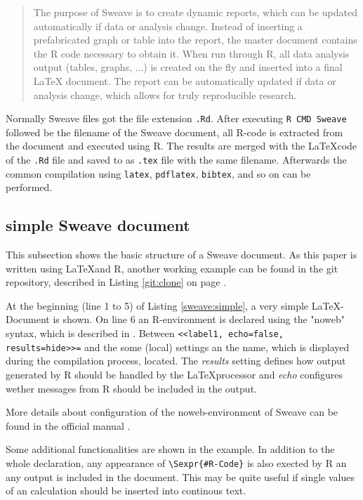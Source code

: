 \documentclass{ifacconf}
\begin{document}
\begin{quotation}
The purpose of Sweave is to create dynamic reports, 
which can be updated automatically if data or
analysis change. Instead of inserting a prefabricated
graph or table into the report, the master document
contains the R code necessary to obtain it. When run
through R, all data analysis output (tables, graphs, ...) 
is created on the fly and inserted into a final \LaTeX
document. The report can be automatically updated
if data or analysis change, which allows for truly reproducible research.
\end{quotation}

Normally Sweave files got the file extension \texttt{.Rd}. 
After executing \texttt{R CMD Sweave} followed be the filename
of the Sweave document, all R-code is extracted from the document and executed using R.
The results are merged with the \LaTeX code of the \texttt{.Rd} file and saved
to as \texttt{.tex} file with the same filename. Afterwards the common 
compilation using \texttt{latex}, \texttt{pdflatex}, \texttt{bibtex}, and so on
can be performed.

\subsection{simple Sweave document}

This subsection shows the basic structure of a Sweave document. As this
paper is written using \LaTeX and R, another working example can be found
in the git repository, described in Listing \ref{git:clone} on page
\pageref{git:clone}.

At the beginning (line 1 to 5) of Listing \ref{sweave:simple}, a very simple
\LaTeX-Document is shown. On line 6 an R-environment is declared using 
the "noweb" syntax, which is described in \cite{Ramsey_1994, Johnson_Johnson_2000}.
Between \newline \texttt{<<label1, echo=false, results=hide>>=} \newline and the
some (local) settings an the name, which is displayed during the
compilation process, located. The \textit{results} setting defines how
output generated by R should be handled by the \LaTeX processor and \textit{echo}
configures wether messages from R should be included in the output.

More details about configuration of the noweb-environment of Sweave can
be found in the official manual \citep{SweaveManual}.

Some additional functionalities are shown in the example. In addition to the
whole declaration, any appearance of \texttt{\textbackslash{}Sexpr\{\#R-Code\}}
is also exected by R an any output is included in the document. This may be
quite useful if single values of an calculation should be inserted into 
continous text.
\end{document}
